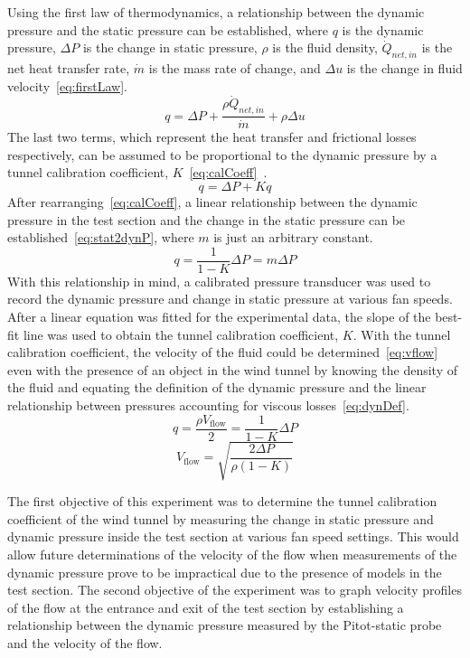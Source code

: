 \documentclass[journal,letterpaper]{IEEEtran}
\begin{document}
Using the first law of thermodynamics, a relationship between the dynamic pressure and the static pressure can be established, where $q$ is the dynamic pressure, $\Delta P$ is the change in static pressure, $\rho$ is the fluid density, $\dot{Q}_{net,in}$ is the net heat transfer rate, $\dot{m}$ is the mass rate of change, and $\Delta u$ is the change in fluid velocity~\eqref{eq:firstLaw}.
\begin{equation} \label{eq:firstLaw}
    q = \Delta P + \frac{\rho \dot{Q}_{net,in}}{\dot{m}} + \rho\Delta u
\end{equation}
The last two terms, which represent the heat transfer and frictional losses respectively, can be assumed to be proportional to the dynamic pressure by a tunnel calibration coefficient, $K$~\eqref{eq:calCoeff}~\cite{lecture}.
\begin{equation} \label{eq:calCoeff}
    q = \Delta P + Kq
\end{equation}
After rearranging~\eqref{eq:calCoeff}, a linear relationship between the dynamic pressure in the test section and the change in the static pressure can be established~\eqref{eq:stat2dynP}, where $m$ is just an arbitrary constant.
\begin{equation} \label{eq:stat2dynP}
    q = \frac{1}{1 - K}\Delta P = m\Delta P
\end{equation}
With this relationship in mind, a calibrated pressure transducer was used to record the dynamic pressure and change in static pressure at various fan speeds.
After a linear equation was fitted for the experimental data, the slope of the best-fit line was used to obtain the tunnel calibration coefficient, $K$.
With the tunnel calibration coefficient, the velocity of the fluid could be determined~\eqref{eq:vflow} even with the presence of an object in the wind tunnel by knowing the density of the fluid and equating the definition of the dynamic pressure and the linear relationship between pressures accounting for viscous losses~\eqref{eq:dynDef}.
\begin{equation} \label{eq:dynDef}
    q = \frac{\rho V_\text{flow}}{2} = \frac{1}{1 - K}\Delta P
\end{equation}
\begin{equation} \label{eq:vflow}
    V_\text{flow} = \sqrt{\frac{2\Delta P}{\rho(1 - K)}}
\end{equation}

The first objective of this experiment was to determine the tunnel calibration coefficient of the wind tunnel by measuring the change in static pressure and dynamic pressure inside the test section at various fan speed settings.
This would allow future determinations of the velocity of the flow when measurements of the dynamic pressure prove to be impractical due to the presence of models in the test section.
The second objective of the experiment was to graph velocity profiles of the flow at the entrance and exit of the test section by establishing a relationship between the dynamic pressure measured by the Pitot-static probe and the velocity of the flow.
\end{document}
